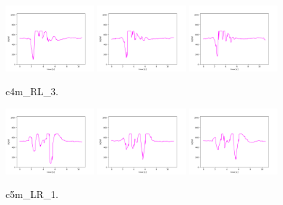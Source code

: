\begin{figure}[!ht]
\begin{center}
\includegraphics[width=0.3\textwidth]{../data/c4m_RL_3/c4m_RL_3_1.png}
\includegraphics[width=0.3\textwidth]{../data/c4m_RL_3/c4m_RL_3_2.png}
\includegraphics[width=0.3\textwidth]{../data/c4m_RL_3/c4m_RL_3_3.png}
\caption{c4m\_RL\_3.\label{fig:c4m_RL_3}}
\end{center}
\end{figure}

\begin{figure}[!ht]
\begin{center}
\includegraphics[width=0.3\textwidth]{../data/c5m_LR_1/c5m_LR_1_1.png}
\includegraphics[width=0.3\textwidth]{../data/c5m_LR_1/c5m_LR_1_2.png}
\includegraphics[width=0.3\textwidth]{../data/c5m_LR_1/c5m_LR_1_3.png}
\caption{c5m\_LR\_1.\label{fig:c5m_LR_1}}
\end{center}
\end{figure}

